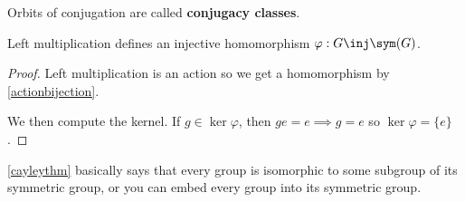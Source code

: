\begin{df}
Orbits of conjugation are called \textbf{conjugacy classes}.
\end{df}

\begin{thm}[Cayley]
\label{cayleythm}
Left multiplication defines an injective homomorphism $\varphi : G \inj
\sym(G)$.
\end{thm}

\begin{proof}
Left multiplication is an action so we get a homomorphism by
\ref{actionbijection}.

We then compute the kernel. If $g \in \ker \varphi$, then $ge = e
\implies g = e$ so $\ker \varphi = \lbrace e \rbrace$.
\end{proof}

\begin{rem}
\ref{cayleythm} basically says that every group is isomorphic to some
subgroup of its symmetric group, or you can embed every group into its
symmetric group.
\end{rem}
